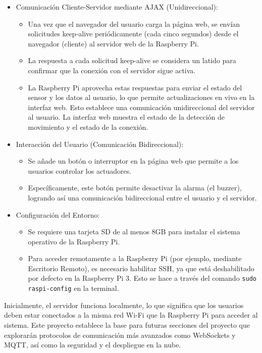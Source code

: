 \documentclass{report}
\begin{document}
\begin{itemize}
    \item Comunicación Cliente-Servidor mediante AJAX (Unidireccional):
    \begin{itemize}
        \item Una vez que el navegador del usuario carga la página web, se envían solicitudes keep-alive periódicamente (cada cinco segundos) 
        desde el navegador (cliente) al servidor web de la Raspberry Pi.
        \item La respuesta a cada solicitud keep-alive se considera un latido para confirmar que la conexión con el servidor sigue activa.
        \item La Raspberry Pi aprovecha estas respuestas para enviar el estado del sensor y los datos al usuario, lo que permite 
        actualizaciones en vivo en la interfaz web. Esto establece una  comunicación unidireccional del servidor al usuario. La 
        interfaz web muestra el estado de la detección de movimiento y el estado de la conexión.
    \end{itemize}

    \item Interacción del Usuario (Comunicación Bidireccional):
    \begin{itemize}
        \item Se añade un botón o interruptor en la página web que permite a los usuarios controlar los actuadores.
        \item Específicamente, este botón permite desactivar la alarma (el buzzer), logrando así una comunicación bidireccional 
        entre el usuario y el servidor.
    \end{itemize}

    \item Configuración del Entorno:
    \begin{itemize}
        \item Se requiere una tarjeta SD de al menos 8GB para instalar el sistema operativo de la Raspberry Pi.
        \item Para acceder remotamente a la Raspberry Pi (por ejemplo, mediante Escritorio Remoto), es necesario habilitar SSH, ya 
        que está deshabilitado por defecto en la Raspberry Pi 3. Esto se hace a través del comando \verb|sudo raspi-config| en la terminal.
    \end{itemize}

\end{itemize}
Inicialmente, el servidor funciona localmente, lo que significa que los usuarios deben estar conectados a la misma red Wi-Fi que la Raspberry Pi 
para acceder al sistema. Este proyecto establece la base para futuras secciones del proyecto que explorarán protocolos de comunicación más avanzados 
como WebSockets y MQTT, así como la seguridad y el despliegue en la nube.
\end{document}
